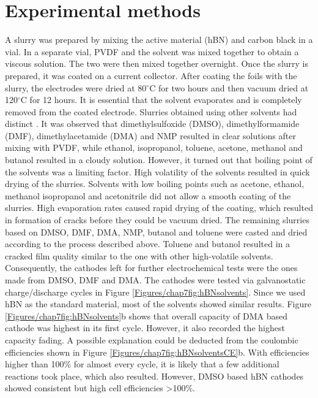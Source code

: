 \section{Experimental methods}
A slurry was prepared by mixing the active material (hBN) and carbon black in a vial. In a separate vial, PVDF and the solvent was mixed together to obtain a viscous solution. The two were then mixed together overnight. Once the slurry is prepared, it was coated on a current collector. After coating the foils with the slurry, the electrodes were dried at 80$^{\circ}$C for two hours and then vacuum dried at 120$^{\circ}$C for 12 hours. It is essential that the solvent evaporates and is completely removed from the coated electrode. 
Slurries obtained using other solvents had distinct . It was observed that dimethylsulfoxide (DMSO), dimethylformamide (DMF), dimethylacetamide (DMA) and NMP resulted in clear solutions after mixing with PVDF, while ethanol, isopropanol, toluene, acetone, methanol and butanol resulted in a cloudy solution. 
However, it turned out that boiling point of the solvents was a limiting factor. High volatility of the solvents resulted in quick drying of the slurries. Solvents with low boiling points such as acetone, ethanol, methanol isopropanol and acetonitrile did not allow a smooth coating of the slurries. High evaporation rates caused rapid drying of the coating, which resulted in formation of cracks before they could be vacuum dried.
The remaining slurries based on DMSO, DMF, DMA, NMP, butanol and toluene were casted and dried according to the process described above. Toluene and butanol resulted in a cracked film quality similar to the one with other high-volatile solvents. Consequently, the cathodes left for further electrochemical tests were the ones made from DMSO, DMF and DMA.
The cathodes were tested via galvanostatic charge/discharge cycles in Figure \ref{Figures/chap7fig:hBNsolvents}. Since we used hBN as the standard material, most of the solvents showed similar results. Figure \ref{Figures/chap7fig:hBNsolvents}b  shows that overall capacity of DMA based cathode was highest in its first cycle. However, it also recorded the highest capacity fading. A possible explanation could be deducted from the coulombic efficiencies shown in Figure \ref{Figures/chap7fig:hBNsolventsCE}b. With efficiencies higher than 100\% for almost every cycle, it is likely that a few additional reactions took place, which also resulted. However, DMSO based hBN cathodes showed consistent but high cell efficiencies >100\%. 

